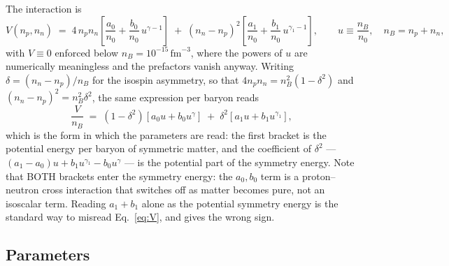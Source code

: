 \documentclass[aps,prc,onecolumn,superscriptaddress,nofootinbib,10pt]{revtex4-2}
\newcommand{\nB}{n_B}
\begin{document}
The interaction is~\cite{ZhaoLattimer2020}
%
\begin{equation}
V(n_p, n_n) \;=\; 4\, n_p n_n \left[ \frac{a_0}{n_0}
      + \frac{b_0}{n_0}\, u^{\gamma - 1} \right]
   \;+\; (n_n - n_p)^2 \left[ \frac{a_1}{n_0}
      + \frac{b_1}{n_0}\, u^{\gamma_1 - 1} \right] ,
\qquad u \equiv \frac{\nB}{n_0} , \quad \nB = n_p + n_n ,
\label{eq:V}
\end{equation}
%
with $V \equiv 0$ enforced below $\nB = 10^{-15}\,\mathrm{fm}^{-3}$, where the
powers of $u$ are numerically meaningless and the prefactors vanish anyway.
Writing $\delta = (n_n - n_p)/\nB$ for the isospin asymmetry, so that
$4 n_p n_n = \nB^2 (1 - \delta^2)$ and $(n_n-n_p)^2 = \nB^2 \delta^2$, the
same expression per baryon reads
%
\begin{equation}
\frac{V}{\nB} \;=\; (1 - \delta^2) \left[ a_0 u + b_0 u^{\gamma} \right]
   \;+\; \delta^2 \left[ a_1 u + b_1 u^{\gamma_1} \right] ,
\label{eq:Vperbaryon}
\end{equation}
%
which is the form in which the parameters are read: the first bracket is the
potential energy per baryon of symmetric matter, and the coefficient of
$\delta^2$ --- $(a_1 - a_0) u + b_1 u^{\gamma_1} - b_0 u^{\gamma}$ --- is the
potential part of the symmetry energy. Note that BOTH brackets enter the
symmetry energy: the $a_0, b_0$ term is a proton--neutron cross interaction
that switches off as matter becomes pure, not an isoscalar term. Reading
$a_1 + b_1$ alone as the potential symmetry energy is the standard way to
misread Eq.~\eqref{eq:V}, and gives the wrong sign.

\subsection{Parameters}
\end{document}
